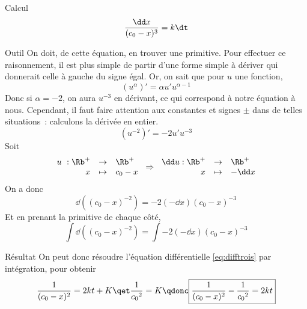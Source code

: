 \documentclass[a4paper, 12pt, final, garamond]{book}
\begin{document}
\begin{enumerate}
\begin{rexem}{Calcul}
            \begin{gather}\label{eq:difftrois}
                \frac{\dd x}{(c_0 -x)^3} = k\dt
            \end{gather}
        \end{rexem}
        \begin{rrapp}{Outil}
            On doit, de cette équation, en trouver une primitive. Pour effectuer ce
            raisonnement, il est plus simple de partir d'une forme simple à dériver
            qui donnerait celle à gauche du signe égal. Or, on sait que pour $u$ une
            fonction,
            \[(u^{\alpha})' = \alpha u' u^{\alpha-1}\]
            Donc si $\alpha = -2$, on aura $u^{-3}$ en dérivant, ce qui correspond à
            notre équation à nous. Cependant, il faut faire attention aux constantes
            et signes $\pm$ dans de telles situations~: calculons la dérivée en
            entier.
            \[(u^{-2})' = -2 u' u^{-3}\]
            Soit
            \begin{gather*}
                \left.\begin{array}{rcl}
                         u~: \Rb^+ & \rightarrow & \Rb^+\\
                        x & \mapsto & c_0 - x\\
                \end{array}\right.
                \Rightarrow
                \left.\begin{array}{rcl}
                        \dd u : \Rb^+ & \rightarrow & \Rb^+\\
                        x & \mapsto & -\dd x\\
                \end{array}\right.
            \end{gather*}
            On a donc
            \[\dd((c_0 -x)^{-2}) = -2 (-\dd x) (c_0 - x)^{-3}\]
            Et en prenant la primitive de chaque côté,
            \[\int\dd((c_0 -x)^{-2}) = \int -2 (-\dd x) (c_0 - x)^{-3}\]
        \end{rrapp}
        \begin{rprop}{Résultat}
            On peut donc résoudre l'équation différentielle \ref{eq:difftrois} par
            intégration, pour obtenir
            \begin{gather*}
                \frac{1}{(c_0 - x)^2} = 2kt + K
                \qet
                \frac{1}{c_0{}^2} = K
                \qdonc
                \boxed{
                \frac{1}{(c_0-x)^2} - \frac{1}{c_0{}^2} = 2kt}
            \end{gather*}

\end{rprop}
\end{enumerate}
\end{document}
